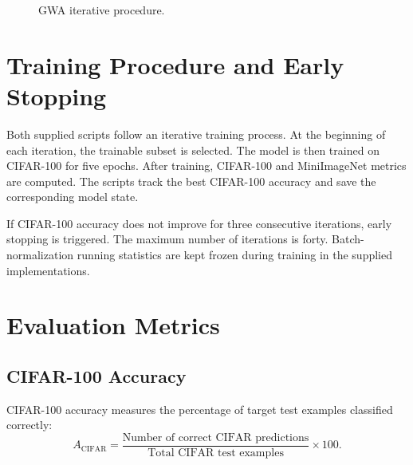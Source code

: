 \documentclass[12pt,a4paper]{report}
\begin{document}
\begin{figure}[H]
\centering
{}
\caption{GWA iterative procedure.}
\label{fig:gwa}
\end{figure}

\section{Training Procedure and Early Stopping}
Both supplied scripts follow an iterative training process. At the
beginning of each iteration, the trainable subset is selected. The
model is then trained on CIFAR-100 for five epochs. After training,
CIFAR-100 and MiniImageNet metrics are computed. The scripts track the
best CIFAR-100 accuracy and save the corresponding model state.

If CIFAR-100 accuracy does not improve for three consecutive
iterations, early stopping is triggered. The maximum number of
iterations is forty. Batch-normalization running statistics are kept
frozen during training in the supplied implementations.

\section{Evaluation Metrics}
\subsection{CIFAR-100 Accuracy}
CIFAR-100 accuracy measures the percentage of target test examples
classified correctly:
\[
A_{\mathrm{CIFAR}}=
\frac{\text{Number of correct CIFAR predictions}}
{\text{Total CIFAR test examples}}\times100.
\]
\end{document}
